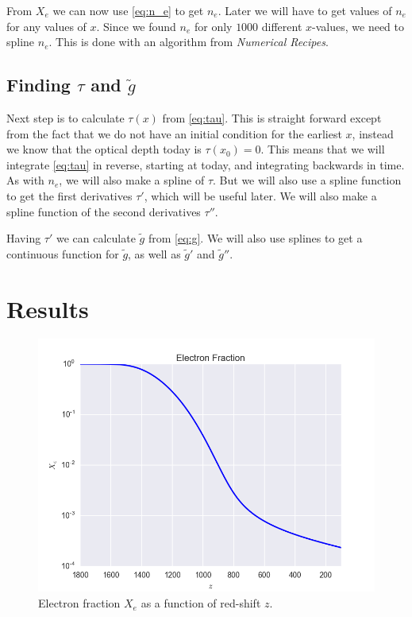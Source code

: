 \documentclass[a4paper,norsk, 10pt]{article}
\begin{document}
From $X_e$ we can now use \eqref{eq:n_e} to get $n_e$. Later we will have to get values of $n_e$ for any values of $x$. Since we found $n_e$ for only $1000$ different $x$-values, we need to spline $n_e$. This is done with an algorithm from \textit{Numerical Recipes}. 

\subsection{Finding $\tau$ and $\tilde{g}$}

Next step is to calculate $\tau (x)$ from \eqref{eq:tau}. This is straight forward except from the fact that we do not have an initial condition for the earliest $x$, instead we know that the optical depth today is $\tau(x_0) = 0$. This means that we will integrate \eqref{eq:tau} in reverse, starting at today, and integrating backwards in time. As with $n_e$, we will also make a spline of $\tau$. But we will also use a spline function to get the first derivatives $\tau'$, which will be useful later. We will also make a spline function of the second derivatives $\tau''$.

Having $\tau'$ we can calculate $\tilde{g}$ from \eqref{eq:g}. We will also use splines to get a continuous function for $\tilde{g}$, as well as $\tilde{g}'$ and $\tilde{g}''$.

\section{Results}

\begin{figure}[!htb]
\centering
\includegraphics[scale=0.5]{xe.png}
\caption{Electron fraction $X_e$ as a function of red-shift $z$.}\label{fig:xe}
\end{figure}
\end{document}
